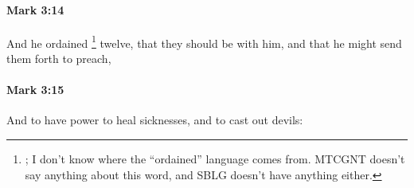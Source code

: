 		\paragraph{Mark 3:14} %
			\label{MARK-3-14}

			And he ordained%
				\footnote{%
					; I don't know where the ``ordained'' language comes from. MTCGNT doesn't say anything about this word, and SBLG doesn't have anything either.
					}
			twelve, that they should be with him, and that he might send them forth to preach,

			\begin{framed}
			\scriptsize
				\begin{compactdesc}
					\item[SBLG] 
				\end{compactdesc}
			\end{framed}

		\paragraph{Mark 3:15} %
			\label{MARK-3-15}

			And to have power to heal sicknesses, and to cast out devils:

